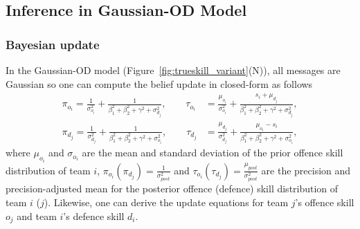 
\subsection{Inference in Gaussian-OD Model}

\subsubsection{Bayesian update} 
In the Gaussian-OD model (Figure~\ref{fig:trueskill_variant}(N)), all
messages are Gaussian so one can
compute the belief update in closed-form as follows
\begin{align}
\label{eq:GaussianGraphicalModelsUpdatingEquation}
  \pi_{o_{i}}  =    \frac{1}{\sigma_{o_{i}}^2} + \frac{1}{\beta_1^2+\beta_2^2+\gamma^2+\sigma_{d_{j}}^2}, \qquad \tau_{o_{i}}    &=    \frac{\mu_{o_{i}}}{\sigma_{o_{i}}^2} + \frac{s_i+\mu_{d_{j}}}{\beta_1^2+\beta_2^2+\gamma^2+\sigma_{d_{j}}^2},  \nonumber \\
  \pi_{d_{j}}  =    \frac{1}{\sigma_{d_{j}}^2} + \frac{1}{\beta_1^2+\beta_2^2+\gamma^2+\sigma_{o_{i}}^2}, \qquad \tau_{d_{j}}    &=    \frac{\mu_{d_{j}}}{\sigma_{d_{j}}^2} + \frac{\mu_{o_{i}}-s_i}{\beta_1^2+\beta_2^2+\gamma^2+\sigma_{o_{i}}^2},
\end{align}
\unindentmore where $\mu_{o_{i}}$ and $\sigma_{o_{i}}$ are the mean
and standard deviation of the prior offence skill distribution of team
$i$, $\pi_{o_{i}} (\pi_{d_{j}}) = \frac{1}{\sigma_{\mathit{post}}^2}$
and $\tau_{o_{i}} (\tau_{d_{j}}) =
\frac{\mu_{\mathit{post}}}{\sigma_{\mathit{post}}^2}$ are the
precision and precision-adjusted mean for the posterior offence
(defence) skill distribution of team $i$ ($j$).  Likewise, one can
derive the update equations for team $j$'s offence skill $o_j$ and
team $i$'s defence skill $d_i$.

